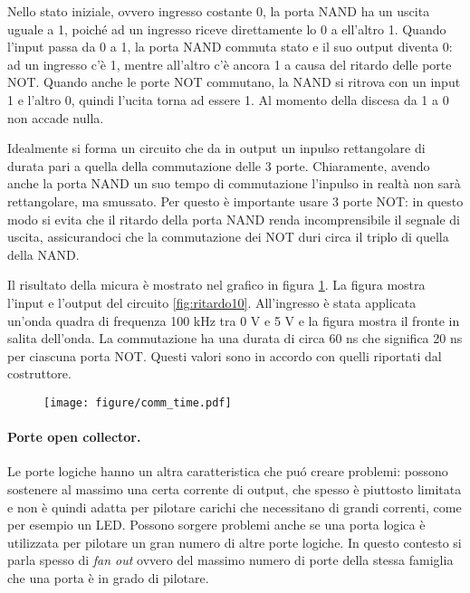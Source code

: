 Nello stato iniziale, ovvero ingresso costante 0, la porta NAND ha un uscita uguale a 1, poiché ad
un ingresso riceve direttamente lo 0 a ell'altro 1. Quando l'input passa da 0 a 1,
la porta NAND commuta stato e il suo output diventa 0: ad un ingresso c'è 1, mentre all'altro c'è ancora 1 a causa del ritardo delle
porte NOT. Quando anche le porte NOT commutano, la NAND si ritrova con un input 1 e l'altro 0, quindi
l'ucita torna ad essere 1. Al momento della discesa da 1 a 0 non accade nulla.

Idealmente si forma un circuito che da in output un inpulso rettangolare di durata pari a quella
della commutazione delle 3 porte. Chiaramente, avendo anche la porta NAND un suo tempo di commutazione
l'inpulso in realtà non sarà rettangolare, ma smussato. Per questo è importante usare 3 porte NOT:
in questo modo si evita che il ritardo della porta NAND renda incomprensibile il segnale di uscita,
assicurandoci che la commutazione dei NOT duri circa il triplo di quella della NAND.

Il risultato della micura è mostrato nel grafico in figura \ref{fig:comm_time_10}.
La figura mostra l'input e l'output del circuito \ref{fig:ritardo10}. All'ingresso è stata applicata
un'onda quadra di frequenza 100 kHz tra 0 V e 5 V e la figura mostra il fronte in salita dell'onda.
La commutazione ha una durata di circa 60 ns che significa 20 ns per ciascuna porta NOT.
Questi valori sono in accordo con quelli riportati dal costruttore.

\begin{figure}[t]
    \centering
    \texttt{[image: figure/comm\_time.pdf]}
    \caption{}
    \label{fig:comm_time_10}
\end{figure}

\paragraph{Porte open collector.}

Le porte logiche hanno un altra caratteristica che puó creare problemi: possono sostenere
al massimo una certa corrente di output, che spesso è piuttosto limitata e non è quindi adatta
per pilotare carichi che necessitano di grandi correnti, come per esempio un LED.
Possono sorgere problemi anche se una porta logica è utilizzata per pilotare un gran numero di
altre porte logiche. In questo contesto si parla spesso di \emph{fan out} ovvero del massimo
numero di porte della stessa famiglia che una porta è in grado di pilotare.

